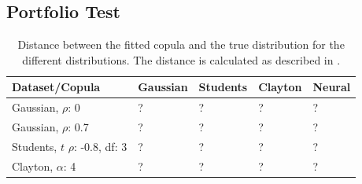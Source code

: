 \subsection{Portfolio Test}


\begin{table}[h!]
    \centering
    \caption{Distance between the fitted copula and the true distribution for the different distributions. The distance is calculated as described in .}
    \begin{tabular}{lllll}
    \textbf{Dataset/Copula} & \textbf{Gaussian} & \textbf{Students} & \textbf{Clayton} & \textbf{Neural} \\
    \hline
    Gaussian, $\rho$: 0 & ? & ? & ? & ? \\
    Gaussian, $\rho$: 0.7 & ? & ? & ? & ? \\
    Students, $t$ $\rho$: -0.8, df: 3 & ? & ? & ? & ? \\
    Clayton, $\alpha$: 4 & ? & ? & ? & ? \\
    \end{tabular}
    \label{tab:DistributionDistances}
\end{table}

